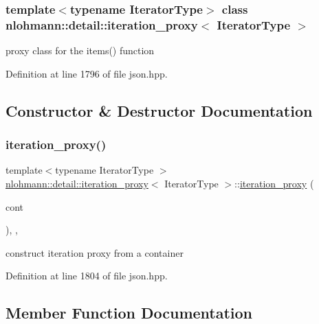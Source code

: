 \subsubsection*{template$<$typename Iterator\+Type$>$\newline
class nlohmann\+::detail\+::iteration\+\_\+proxy$<$ Iterator\+Type $>$}

proxy class for the items() function 

Definition at line 1796 of file json.\+hpp.



\subsection{Constructor \& Destructor Documentation}
\mbox{\label{classnlohmann_1_1detail_1_1iteration__proxy_afe257e972e3b4658ef2e355f7389d4a5}} 
\subsubsection{\texorpdfstring{iteration\_proxy()}{iteration\_proxy()}}
{\footnotesize\ttfamily template$<$typename Iterator\+Type $>$ \\
\mbox{\hyperlink{classnlohmann_1_1detail_1_1iteration__proxy}{nlohmann\+::detail\+::iteration\+\_\+proxy}}$<$ Iterator\+Type $>$\+::\mbox{\hyperlink{classnlohmann_1_1detail_1_1iteration__proxy}{iteration\+\_\+proxy}} (\begin{DoxyParamCaption}\item[{typename Iterator\+Type\+::reference}]{cont }\end{DoxyParamCaption})\hspace{0.3cm}{\ttfamily [inline]}, {\ttfamily [explicit]}, {\ttfamily [noexcept]}}



construct iteration proxy from a container 



Definition at line 1804 of file json.\+hpp.



\subsection{Member Function Documentation}
\mbox{\label{classnlohmann_1_1detail_1_1iteration__proxy_a379f86709d340c4ab1995539b8af623d}} 
